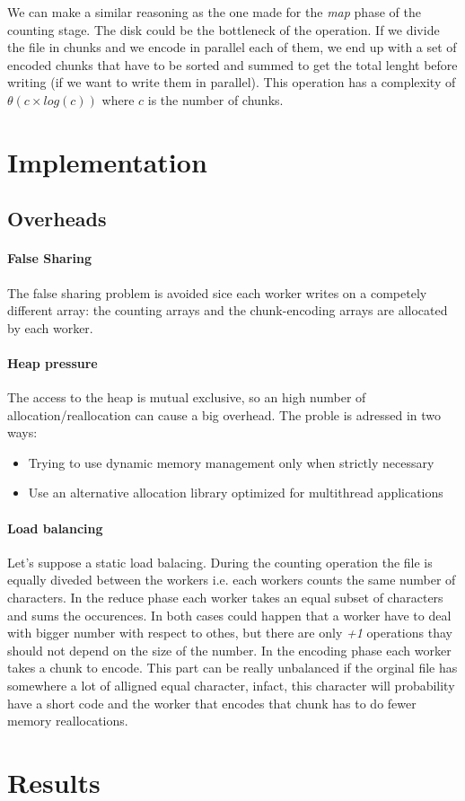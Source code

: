 \documentclass[12pt, letterpaper]{article}  %
\begin{document}
We can make a similar reasoning as the one made for the \textit{map} phase of the counting stage. The disk could be the bottleneck of the operation.
If we divide the file in chunks and we encode in parallel each of them, we end up with a set of encoded chunks that have to be sorted and summed to 
get the total lenght before writing (if we want to write them in parallel). This operation has a complexity of $\theta(c \times log(c))$ where $c$ is the number of chunks.


\section{Implementation}

\subsection{Overheads}

\paragraph*{False Sharing}
The false sharing problem is avoided sice each worker writes on a competely different array: the counting arrays
and the chunk-encoding arrays are allocated by each worker.

\paragraph*{Heap pressure}
The access to the heap is mutual exclusive, so an high number of allocation/reallocation can cause a big overhead.
The proble is adressed in two ways:
\begin{itemize}
    \item Trying to use dynamic memory management only when strictly necessary
    \item Use an alternative allocation library optimized for multithread applications
\end{itemize}

\paragraph*{Load balancing}
Let's suppose a static load balacing. During the counting operation the file is equally diveded between the workers i.e. each workers counts the same
number of characters. In the reduce phase each worker takes an equal subset of characters and sums the occurences.
In both cases could happen that a worker have to deal with bigger number with respect to othes, but there are 
only \textit{+1} operations thay should not depend on the size of the number. In the encoding phase each
worker takes a chunk to encode. This part can be really unbalanced if the orginal file has somewhere a lot of 
alligned equal character, infact, this character will probability have a short code and the worker 
that encodes that chunk has to do fewer memory reallocations.




\section{Results \label{sec:results}}



\newpage \FloatBarrier


\end{document}
